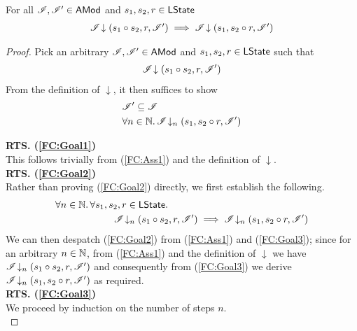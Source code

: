 \begin{lemma}\label{lem:forget-closure}
For all $\mathscr{I}, \mathscr{I}' \in \textsf{AMod}$ and $s_1, s_2, r \in \textsf{LState}$
%
\[
\begin{array}{l}
	\mathscr{I} \!\downarrow \left(s_1 \circ s_2, r, \mathscr{I}'\right) \implies 
	\mathscr{I} \!\downarrow \left(s_1, s_2 \circ r, \mathscr{I}'\right)
\end{array}
\]
%
\begin{proof} Pick an arbitrary $\mathscr{I}, \mathscr{I}' \in \textsf{AMod}$ and $s_1, s_2, r \in \textsf{LState}$ such that 
%
\begin{align}
	\mathscr{I} \!\downarrow \left(s_1 \circ s_2, r, \mathscr{I}'\right) \label{FC:Ass1}
\end{align} 
%
From the definition of $\downarrow$, it then suffices to show
%
\begin{align}
	& \mathscr{I}' \subseteq \mathscr{I} \label{FC:Goal1}\\
	& \forall n \in \mathbb{N}.\,  \mathscr{I} \!\downarrow_{n} \left(s_1, s_2 \circ r, \mathscr{I}'\right) \label{FC:Goal2}
\end{align}
%

\noindent\textbf{RTS. (\ref{FC:Goal1})} \\
This follows trivially from (\ref{FC:Ass1}) and the definition of $\downarrow$.\\

\noindent\textbf{RTS. (\ref{FC:Goal2})} \\
Rather than proving (\ref{FC:Goal2}) directly, we first establish the following.
%
\begin{align}
	\for {n \in \Nats} \for{s_1, s_2, r \in \LStates} & \nonumber\\
	& \hspace{-2cm}\extendsAMUpto{\lmod}{n}{s_1 \composeL s_2}{r}{\lmod'} \implies \extendsAMUpto{\lmod}{n}{s_1}{s_2 \composeL r}{\lmod'} \label{FC:Goal3}
\end{align}
%
We can then despatch (\ref{FC:Goal2}) from (\ref{FC:Ass1}) and (\ref{FC:Goal3}); since for an arbitrary $n \in \mathbb{N}$, from (\ref{FC:Ass1}) and the definition of $\downarrow$ we have $\mathscr{I} \!\downarrow_{n} \left(s_1 \circ s_2, r, \mathscr{I}'\right)$ and consequently from (\ref{FC:Goal3}) we derive $\mathscr{I} \!\downarrow_{n} \left(s_1, s_2 \circ r, \mathscr{I}'\right) $ as required. \\

\noindent\textbf{RTS. (\ref{FC:Goal3})} \\
We proceed by induction on the number of steps $n$.\\


\end{proof}
\end{lemma}
